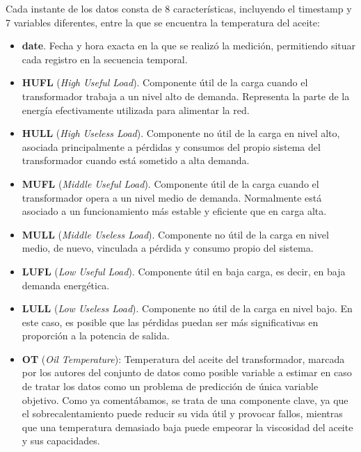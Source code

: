 Cada instante de los datos consta de 8 características, incluyendo el timestamp y 7 variables diferentes, entre la que se encuentra la temperatura del aceite:

\begin{itemize}
	\item \textbf{date}. Fecha y hora exacta en la que se realizó la medición, permitiendo situar cada registro en la secuencia temporal.
	
	\item \textbf{HUFL} (\textit{High Useful Load}). Componente útil de la carga cuando el transformador trabaja a un nivel alto de demanda. Representa la parte de la energía efectivamente utilizada para alimentar la red.
	
	\item \textbf{HULL} (\textit{High Useless Load}). Componente no útil de la carga en nivel alto, asociada principalmente a pérdidas y consumos del propio sistema del transformador cuando está sometido a alta demanda.
	
	\item \textbf{MUFL} (\textit{Middle Useful Load}). Componente útil de la carga cuando el transformador opera a un nivel medio de demanda. Normalmente está asociado a un funcionamiento más estable y eficiente que en carga alta.
	
	\item \textbf{MULL} (\textit{Middle Useless Load}). Componente no útil de la carga en nivel medio, de nuevo, vinculada a pérdida y consumo propio del sistema.
	
	\item \textbf{LUFL} (\textit{Low Useful Load}). Componente útil en baja carga, es decir, en baja demanda energética.
	
	\item \textbf{LULL} (\textit{Low Useless Load}). Componente no útil de la carga en nivel bajo. En este caso, es posible que las pérdidas puedan ser más significativas en proporción a la potencia de salida.
	
	\item \textbf{OT} (\textit{Oil Temperature}): Temperatura del aceite del transformador, marcada por los autores del conjunto de datos como posible variable a estimar en caso de tratar los datos como un problema de predicción de única variable objetivo. Como ya comentábamos, se trata de una componente clave, ya que el sobrecalentamiento puede reducir su vida útil y provocar fallos, mientras que una temperatura demasiado baja puede empeorar la viscosidad del aceite y sus capacidades.
\end{itemize}

